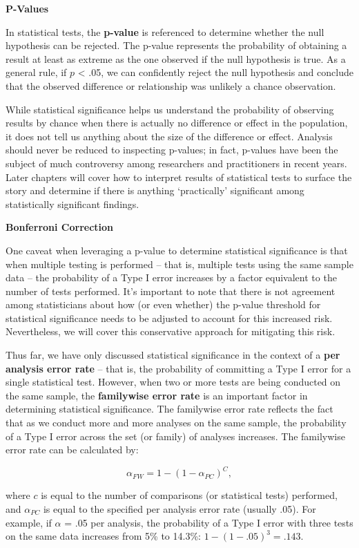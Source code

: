 \documentclass[]{book}
\begin{document}
\textbf{P-Values}

In statistical tests, the \textbf{p-value} is referenced to determine whether the null hypothesis can be rejected. The p-value represents the probability of obtaining a result at least as extreme as the one observed if the null hypothesis is true. As a general rule, if \(p\) \textless{} .05, we can confidently reject the null hypothesis and conclude that the observed difference or relationship was unlikely a chance observation.

While statistical significance helps us understand the probability of observing results by chance when there is actually no difference or effect in the population, it does not tell us anything about the size of the difference or effect. Analysis should never be reduced to inspecting p-values; in fact, p-values have been the subject of much controversy among researchers and practitioners in recent years. Later chapters will cover how to interpret results of statistical tests to surface the story and determine if there is anything `practically' significant among statistically significant findings.

\textbf{Bonferroni Correction}

One caveat when leveraging a p-value to determine statistical significance is that when multiple testing is performed -- that is, multiple tests using the same sample data -- the probability of a Type I error increases by a factor equivalent to the number of tests performed. It's important to note that there is not agreement among statisticians about how (or even whether) the p-value threshold for statistical significance needs to be adjusted to account for this increased risk. Nevertheless, we will cover this conservative approach for mitigating this risk.

Thus far, we have only discussed statistical significance in the context of a \textbf{per analysis error rate} -- that is, the probability of committing a Type I error for a single statistical test. However, when two or more tests are being conducted on the same sample, the \textbf{familywise error rate} is an important factor in determining statistical significance. The familywise error rate reflects the fact that as we conduct more and more analyses on the same sample, the probability of a Type I error across the set (or family) of analyses increases. The familywise error rate can be calculated by:

\[ \alpha_{FW} = 1 - (1 - \alpha_{PC})^C,  \]

where \(c\) is equal to the number of comparisons (or statistical tests) performed, and \(\alpha_{PC}\) is equal to the specified per analysis error rate (usually .05). For example, if \(\alpha\) = .05 per analysis, the probability of a Type I error with three tests on the same data increases from 5\% to 14.3\%: \(1 - (1 - .05)^3 = .143\).
\end{document}
